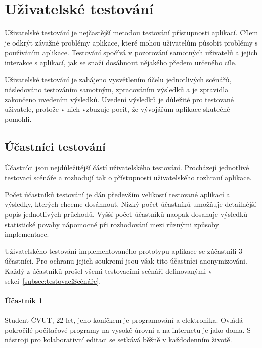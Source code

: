 
\section{Uživatelské testování}\label{sec:uživatelskéTestování}

Uživatelské testování je nejčastější metodou testování přístupnosti aplikací.
Cílem je odkrýt závažné problémy aplikace, které mohou uživatelům působit problémy s používáním aplikace.
Testování spočívá v pozorování samotných uživatelů a jejich interakce s aplikací, jak se snaží dosáhnout nějakého předem určeného cíle.

Uživatelské testování je zahájeno vysvětlením účelu jednotlivých scénářů, následováno testováním samotným, zpracováním výsledků a je zpravidla zakončeno uvedením výsledků.
Uvedení výsledků je důležité pro testované uživatele, protože v nich vzbuzuje pocit, že vývojářům aplikace skutečně pomohli.~\cite{book:userTesting}



\subsection{Účastníci testování}\label{subsec:účastníciTestování}

Účastníci jsou nejdůležitější částí uživatelského testování.
Procházejí jednotlivé testovací scénáře a rozhodují tak o přístupnosti uživatelského rozhraní aplikace.

Počet účastníků testování je dán především velikostí testované aplikací a výsledky, kterých chceme dosáhnout.
Nízký počet účastníků umožňuje detailnější popis jednotlivých průchodů.
Vyšší počet účastníků naopak dosahuje výsledků statistické povahy nápomocné při rozhodování mezi různými způsoby implementace.

Uživatelského testování implementovaného prototypu aplikace se zúčastnili 3 účastníci.
Pro ochranu jejich soukromí jsou však tito účastníci anonymizováni.
Každý z účastníků prošel všemi testovacími scénáři definovanými v sekci~\ref{subsec:testovacíScénáře}.

\paragraph{Účastník 1}
Student \acrshort{ČVUT}, 22 let, jeho koníčkem je programování a elektronika.
Ovládá pokročilé počítačové programy na vysoké úrovni a na internetu je jako doma.
S nástroji pro kolaborativní editaci se setkává běžně v každodenním životě.

